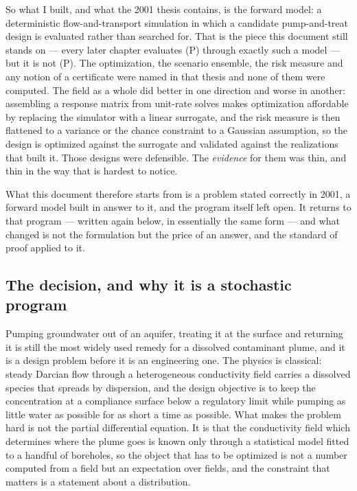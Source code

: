 \documentclass[11pt]{article}
\begin{document}
So what I built, and what the 2001 thesis contains, is the forward model: a
deterministic flow-and-transport simulation in which a candidate pump-and-treat
design is evaluated rather than searched for. That is the piece this document
still stands on --- every later chapter evaluates (P) through exactly such a
model --- but it is not (P). The optimization, the scenario ensemble, the risk
measure and any notion of a certificate were named in that thesis and none of them
were computed. The field as a whole did better in one direction and worse in
another: assembling a response matrix from unit-rate solves
\citep{gorelick1983,wagner1995,mayer2002,ahlfeld2000} makes optimization
affordable by replacing the simulator with a linear surrogate, and the risk
measure is then flattened to a variance or the chance constraint to a Gaussian
assumption, so the design is optimized against the surrogate and validated
against the realizations that built it. Those designs were defensible. The
\emph{evidence} for them was thin, and thin in the way that is hardest to notice.

What this document therefore starts from is a problem stated correctly in 2001, a
forward model built in answer to it, and the program itself left open. It returns
to that program --- written again below, in essentially the same form --- and what
changed is not the formulation but the price of an answer, and the standard of
proof applied to it.

\subsection{The decision, and why it is a stochastic program}

Pumping groundwater out of an aquifer, treating it at the surface and returning
it is still the most widely used remedy for a dissolved contaminant plume, and it
is a design problem before it is an engineering one. The physics is classical:
steady Darcian flow through a heterogeneous conductivity field carries a
dissolved species that spreads by dispersion, and the design objective is to keep
the concentration at a compliance surface below a regulatory limit while pumping
as little water as possible for as short a time as possible. What makes the
problem hard is not the partial differential equation. It is that the
conductivity field which determines where the plume goes is known only through a
statistical model fitted to a handful of boreholes, so the object that has to be
optimized is not a number computed from a field but an expectation over fields,
and the constraint that matters is a statement about a distribution.
\end{document}
